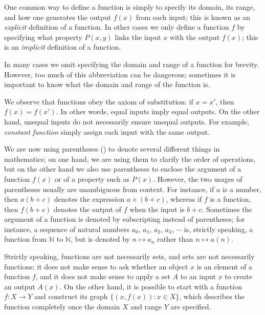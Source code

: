 One common way to define a function is simply to specify its domain, its range, and how one generates the output \(f(x)\) from each input;
this is known as an \emph{explicit} definition of a function.
In other cases we only define a function \(f\) by specifying what property \(P(x, y)\) links the input \(x\) with the output \(f(x)\);
this is an \emph{implicit} definition of a function.

In many cases we omit specifying the domain and range of a function for brevity.
However, too much of this abbreviation can be dangerous;
sometimes it is important to know what the domain and range of the function is.

We observe that functions obey the axiom of substitution: if \(x = x'\), then \(f(x) = f(x')\).
In other words, equal inputs imply equal outputs.
On the other hand, unequal inputs do not necessarily ensure unequal outputs.
For example, \emph{constant function} simply assign each input with the same output.

\setcounter{theorem}{4}
\begin{remark}\label{3.3.5}
We are now using parentheses () to denote several different things in mathematics;
on one hand, we are using them to clarify the order of operations, but on the other hand we also use parentheses to enclose the argument of a function \(f(x)\) or of a property such as \(P(x)\).
However, the two usages of parentheses usually are unambiguous from context.
For instance, if \(a\) is a number, then \(a(b + c)\) denotes the expression \(a \times (b + c)\), whereas if \(f\) is a function, then \(f(b + c)\) denotes the output of \(f\) when the input is \(b + c\).
Sometimes the argument of a function is denoted by subscripting instead of parentheses;
for instance, a sequence of natural numbers \(a_0\), \(a_1\), \(a_2\), \(a_3\), \(\cdots\) is, strictly speaking, a function from \(\mathds{N}\) to \(\mathds{N}\), but is denoted by \(n \mapsto a_n\) rather than \(n \mapsto a(n)\).
\end{remark}

\begin{remark}\label{3.3.6}
Strictly speaking, functions are not necessarily sets, and sets are not necessarily functions;
it does not make sense to ask whether an object \(x\) is an element of a function \(f\), and it does not make sense to apply a set \(A\) to an input \(x\) to create an output \(A(x)\).
On the other hand, it is possible to start with a function \(f : X \to Y\) and construct its graph \(\{(x, f(x)) : x \in X\}\), which describes the function completely once the domain \(X\) and range \(Y\) are specified.
\end{remark}

